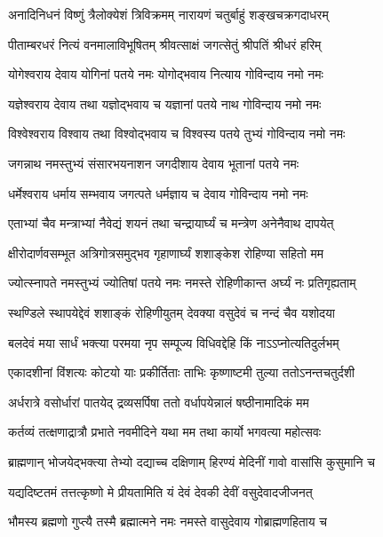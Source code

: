 \twolineshloka
{अनादिनिधनं विष्णुं त्रैलोक्येशं त्रिविक्रमम्}
{नारायणं चतुर्बाहुं शङ्खचक्रगदाधरम्}%


\twolineshloka
{पीताम्बरधरं नित्यं वनमालाविभूषितम्}
{श्रीवत्साक्षं जगत्सेतुं श्रीपतिं श्रीधरं हरिम्}%


\twolineshloka
{योगेश्वराय देवाय योगिनां पतये नमः}
{योगोद्भवाय नित्याय गोविन्दाय नमो नमः}%


\twolineshloka
{यज्ञेश्वराय देवाय तथा यज्ञोद्भवाय च}
{यज्ञानां पतये नाथ गोविन्दाय नमो नमः}%


\twolineshloka
{विश्वेश्वराय विश्वाय तथा विश्वोद्भवाय च}
{विश्वस्य पतये तुभ्यं गोविन्दाय नमो नमः}%


\twolineshloka
{जगन्नाथ नमस्तुभ्यं संसारभयनाशन}
{जगदीशाय देवाय भूतानां पतये नमः}%


\twolineshloka
{धर्मेश्वराय धर्माय सम्भवाय जगत्पते}
{धर्मज्ञाय च देवाय गोविन्दाय नमो नमः}%


\twolineshloka
{एताभ्यां चैव मन्त्राभ्यां नैवेद्यं शयनं तथा}
{चन्द्रायार्घ्यं च मन्त्रेण अनेनैवाथ दापयेत्}%


\twolineshloka
{क्षीरोदार्णवसम्भूत अत्रिगोत्रसमुद्भव}
{गृहाणार्घ्यं शशाङ्केश रोहिण्या सहितो मम}%


\twolineshloka
{ज्योत्स्नापते नमस्तुभ्यं ज्योतिषां पतये नमः}
{नमस्ते रोहिणीकान्त अर्घ्यं नः प्रतिगृह्यताम्}%


\twolineshloka
{स्थण्डिले स्थापयेद्देवं शशाङ्कं रोहिणीयुतम्}
{देवक्या वसुदेवं च नन्दं चैव यशोदया}%


\twolineshloka
{बलदेवं मया सार्धं भक्त्या परमया नृप}
{सम्पूज्य विधिवद्देहि किं नाऽऽप्नोत्यतिदुर्लभम्}%


\twolineshloka
{एकादशीनां विंशत्यः कोटयो याः प्रकीर्तिताः}
{ताभिः कृष्णाष्टमी तुल्या ततोऽनन्तचतुर्दशी}%


\twolineshloka
{अर्धरात्रे वसोर्धारां पातयेद् द्रव्यसर्पिषा}
{ततो वर्धापयेन्नालं षष्ठीनामादिकं मम}%


\twolineshloka
{कर्तव्यं तत्क्षणाद्रात्रौ प्रभाते नवमीदिने}
{यथा मम तथा कार्यो भगवत्या महोत्सवः}%


\twolineshloka
{ब्राह्मणान् भोजयेद्भक्त्या तेभ्यो दद्याच्च दक्षिणाम्}
{हिरण्यं मेदिनीं गावो वासांसि कुसुमानि च}%


\twolineshloka
{यद्यदिष्टतमं तत्तत्कृष्णो मे प्रीयतामिति}
{यं देवं देवकी देवीं वसुदेवादजीजनत्}%


\twolineshloka
{भौमस्य ब्रह्मणो गुप्त्यै तस्मै ब्रह्मात्मने नमः}
{नमस्ते वासुदेवाय गोब्राह्मणहिताय च}%


